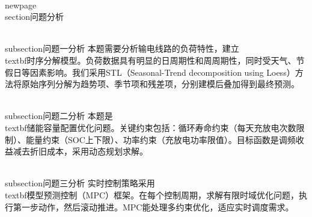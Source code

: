 \\newpage
\\section{问题分析}

\\subsection{问题一分析}
本题需要分析输电线路的负荷特性，建立\\textbf{时序分解模型}。负荷数据具有明显的日周期性和周周期性，同时受天气、节假日等因素影响。我们采用STL（Seasonal-Trend decomposition using Loess）方法将原始序列分解为趋势项、季节项和残差项，分别建模后叠加得到最终预测。

\\subsection{问题二分析}
本题是\\textbf{储能容量配置优化}问题。关键约束包括：循环寿命约束（每天充放电次数限制）、能量约束（SOC上下限）、功率约束（充放电功率限值）。目标函数是调频收益减去折旧成本，采用动态规划求解。

\\subsection{问题三分析}
实时控制策略采用\\textbf{模型预测控制}（MPC）框架。在每个控制周期，求解有限时域优化问题，执行第一步动作，然后滚动推进。MPC能处理多约束优化，适应实时调度需求。
